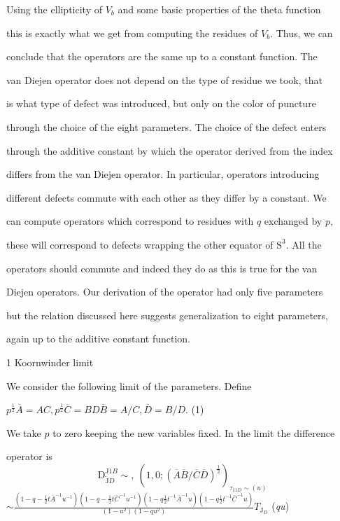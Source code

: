 \documentclass[a4paper,12pt]{article}
\begin{document}
Using the ellipticity of $V_{b}$ and some basic properties of the theta function

this is exactly what we get from computing the residues of $V_{b}$. Thus, we can

conclude that the operators are the same up to a constant function. The

van Diejen operator does not depend on the type of residue we took, that

is what type of defect was introduced, but only on the color of puncture

through the choice of the eight parameters. The choice of the defect enters

through the additive constant by which the operator derived from the index

differs from the van Diejen operator. In particular, operators introducing

different defects commute with each other as they differ by a constant. We

can compute operators which correspond to residues with $q$ exchanged by $p,$

these will correspond to defects wrapping the other equator of $\mathrm{S}^{3}$. All the

operators should commute and indeed they do as this is true for the van

Diejen operators. Our derivation of the operator had only five parameters

but the relation discussed here suggests generalization to eight parameters,

again up to the additive constant function.

1 Koornwinder limit

We consider the following limit of the parameters. Define
\begin{center}
$p^{\frac{1}{2}}\overline{A}=AC, p^{\frac{1}{2}}\overline{C}=BD \overline{B}=A/C, \overline{D}=B/D$. (1)
\end{center}
We take $p$ to zero keeping the new variables fixed. In the limit the difference

operator is
$$
\mathrm{D}_{\tilde{\mathrm{J}}D}^{\mathrm{J}1B}\sim,\ (1,0;(\overline{A}\overline{B}/\overline{C}\overline{D})^{\frac{1}{2}})_{\tau_{11D}\sim(u)}
$$
$\displaystyle \sim\frac{(1-q-\frac{1}{2}t\overline{A}^{-1}u^{-1})(1-q-\frac{1}{2}t\overline{C}^{-1}u^{-1})(1-q\frac{1}{2}t^{-1}\overline{A}^{-1}u)(1-q\frac{1}{2}t^{-1}\overline{C}^{-1}u)}{(1-u^{2})(1-qu^{2})}T_{\mathrm{J}_{D}}$ ({\it qu})
\end{document}
